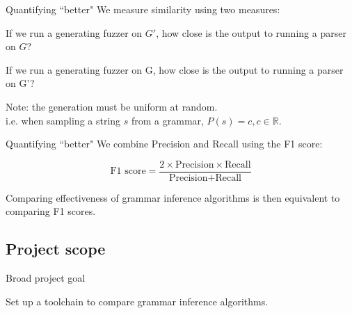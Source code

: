 \documentclass{beamer}
\begin{document}
\begin{frame}{Quantifying ``better"}
	We measure similarity using two measures:
	\begin{definition}[Precision]
		If we run a generating fuzzer on $G'$, how close is the output to running a parser on $G$?


	\end{definition}
	\begin{definition}[Recall]
		If we run a generating fuzzer on G, how close is the output to running a parser on G'?

	\end{definition}
	Note: the generation must be \alert{uniform at random.}\\i.e. when sampling a string $s$ from a grammar, $P(s) = c, c \in \mathbb{R}$.
\end{frame}

	\begin{frame}[c]{Quantifying ``better"}
		We combine Precision and Recall using the F1 score:
		\begin{definition}
			$$\text{F1 score} = \frac{2 \times \text{Precision} \times \text{Recall}}{\text{Precision} + \text{Recall}}$$
		\end{definition}
		\vspace{30pt}
		Comparing effectiveness of grammar inference algorithms is then equivalent to comparing F1 scores.
	\end{frame}

	\subsection{Project scope} %

\begin{frame}{Broad project goal}
	\begin{alertblock}{}
		Set up a toolchain to compare grammar inference algorithms.
	\end{alertblock}
\end{frame}
\end{document}
